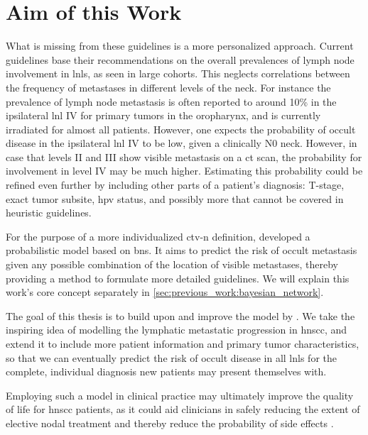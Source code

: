 \documentclass[\relativeRoot/main.tex]{subfiles}
\begin{document}
\section{Aim of this Work}
\label{sec:intro:aim}

What is missing from these guidelines is a more personalized approach. Current guidelines base their recommendations on the overall prevalences of lymph node involvement in \glspl{lnl}, as seen in large cohorts. This neglects correlations between the frequency of metastases in different levels of the neck. For instance the prevalence of lymph node metastasis is often reported to around 10\% in the ipsilateral \gls{lnl} IV for primary tumors in the oropharynx, and is currently irradiated for almost all patients. However, one expects the probability of occult disease in the ipsilateral \gls{lnl} IV to be low, given a clinically N0 neck. However, in case that levels II and III show visible metastasis on a \gls{ct} scan, the probability for involvement in level IV may be much higher. Estimating this probability could be refined even further by including other parts of a patient's diagnosis: T-stage, exact tumor subsite, \gls{hpv} status, and possibly more that cannot be covered in heuristic guidelines.

For the purpose of a more individualized \gls{ctv-n} definition,  developed a probabilistic model based on \glspl{bn}. It aims to predict the risk of occult metastasis given any possible combination of the location of visible metastases, thereby providing a method to formulate more detailed guidelines. We will explain this work's core concept separately in \cref{sec:previous_work:bayesian_network}.

The goal of this thesis is to build upon and improve the model by . We take the inspiring idea of modelling the lymphatic metastatic progression in \gls{hnscc}, and extend it to include more patient information and primary tumor characteristics, so that we can eventually predict the risk of occult disease in all \glspl{lnl} for the complete, individual diagnosis new patients may present themselves with.

Employing such a model in clinical practice may ultimately improve the quality of life for \gls{hnscc} patients, as it could aid clinicians in safely reducing the extent of elective nodal treatment and thereby reduce the probability of side effects \cite{batth_practical_2014}.
\end{document}
